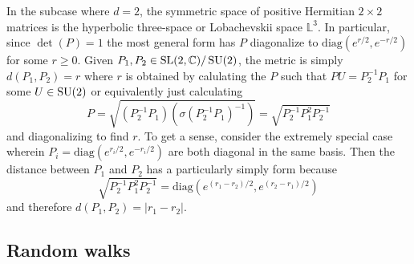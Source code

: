 \documentclass[notitlepage]{article}
\begin{document}
In the subcase where $d=2$, the symmetric space of positive Hermitian $2\times 2$ matrices is the hyperbolic three-space or Lobachevskii space $\mathbb L^{3}$.
In particular, since $\det(P) = 1$ the most general form has $P$ diagonalize to $\mathrm{diag}(e^{r/2}, e^{-r/2})$ for some $r \geq 0$.
Given $P_1,P_2 \in \operatorname{SL}(2,\mathbb C)/\operatorname{SU}(2)$, the metric is simply $d(P_1,P_2)=r$ where $r$ is obtained by calulating the $P$ such that $P U = P_2^{-1}P_1$ for some $U \in \operatorname{SU}(2)$ or equivalently just calculating
\begin{equation}
    P = \sqrt{(P_2^{-1}P_1)(\sigma(P_2^{-1}P_1)^{-1})} = \sqrt{P_2^{-1}P_1^2P_2^{-1}}
\end{equation}
and diagonalizing to find $r$.
To get a sense, consider the extremely special case wherein $P_i = \mathrm{diag}(e^{r_i/2},e^{-r_i/2})$ are both diagonal in the same basis.
Then the distance between $P_1$ and $P_2$ has a particularly simply form because
\begin{equation}
    \sqrt{P_2^{-1}P_1^2P_2^{-1}} = \mathrm{diag}(e^{(r_1-r_2)/2}, e^{(r_2-r_1)/2})
\end{equation}
and therefore $d(P_1, P_2) = |r_1 - r_2|$.

\subsection{Random walks}
\end{document}
